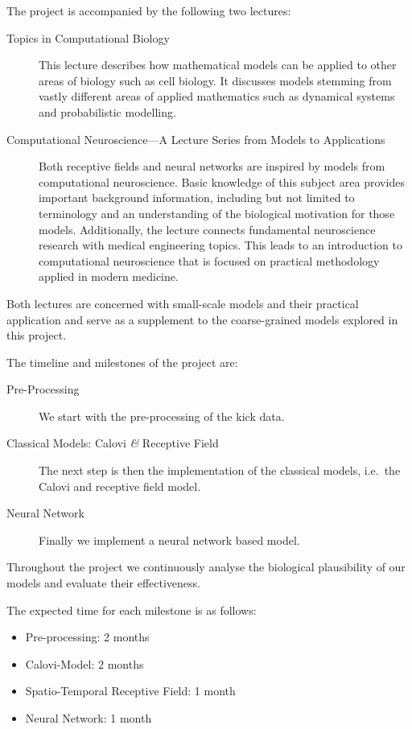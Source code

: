 \documentclass[11pt]{article}
\begin{document}
The project is accompanied by the following two lectures:
\begin{description}
\item[Topics in Computational Biology] 
This lecture describes how mathematical models can be applied to other areas of biology such as cell biology.
It discusses models stemming from vastly different areas of applied mathematics such as dynamical systems and probabilistic modelling. 
\item[Computational Neuroscience---A Lecture Series from Models to Applications]
Both receptive fields and neural networks are inspired by models from computational neuroscience.
Basic knowledge of this subject area provides important background information, including but not limited to terminology and an understanding of the biological motivation for those models.
Additionally, the lecture connects fundamental neuroscience research with medical engineering topics.
This leads to an introduction to computational neuroscience that is focused on practical methodology applied in modern medicine.
\end{description}
Both lectures are concerned with small-scale models and their practical application and serve as a supplement to the coarse-grained models explored in this project.

The timeline and milestones of the project are:
\begin{description}
\item[Pre-Processing]
We start with the pre-processing of the kick data.
\item[Classical Models: Calovi \textit{\&} Receptive Field]
The next step is then the implementation of the classical models, i.e.\ the Calovi and receptive field model.
\item[Neural Network]
Finally we implement a neural network based model.
\end{description}
Throughout the project we continuously analyse the biological plausibility of our models and evaluate their effectiveness.

The expected time for each milestone is as follows:
\begin{itemize}
\item Pre-processing: 2 months
\item Calovi-Model: 2 months
\item Spatio-Temporal Receptive Field: 1 month
\item Neural Network: 1 month
\end{itemize}
\end{document}
